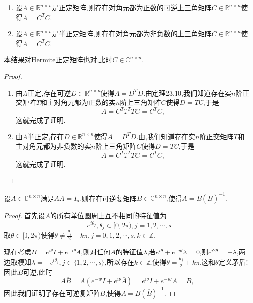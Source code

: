 \documentclass[../../main.tex]{subfiles}
\begin{document}
\begin{theorem}[正定矩阵分解为上三角]\label{theorem:正定矩阵分解为上三角}
\begin{enumerate}
\item 设\( A \in \mathbb{R}^{n \times n} \)是正定矩阵,则存在对角元都为正数的可逆上三角矩阵\( C \in \mathbb{R}^{n \times n} \)使得\( A = C^T C \).

\item 设\( A \in \mathbb{R}^{n \times n} \)是半正定矩阵,则存在对角元都为非负数的上三角矩阵\( C \in \mathbb{R}^{n \times n} \)使得\( A = C^T C \).
\end{enumerate}
\end{theorem}
\begin{note}
本结果对Hermite正定矩阵也对,此时\( C \in \mathbb{C}^{n \times n} \).
\end{note}
\begin{proof}
\begin{enumerate}
\item 由\( A \)正定,存在可逆\( D \in \mathbb{R}^{n \times n} \)使得\( A = D^T D \).由定理23.10,我们知道存在实\( n \)阶正交矩阵\( T \)和主对角元都为正数的实\( n \)阶上三角矩阵\( C \)使得\( D = TC \),于是
\[
A = C^T T^T T C = C^T C,
\]
这就完成了证明.

\item 由\( A \)半正定,存在\( D \in \mathbb{R}^{n \times n} \)使得\( A = D^T D \).由,我们知道存在实\( n \)阶正交矩阵\( T \)和主对角元都为非负数的实\( n \)阶上三角矩阵\( C \)使得\( D = TC \),于是
\[
A = C^T T^T T C = C^T C,
\]
这就完成了证明.
\end{enumerate}
\end{proof}

\begin{theorem}\label{theorem:定理1354846135}
设\( A \in \mathbb{C}^{n \times n} \)满足\( A \overline{A} = I_n \),则存在可逆复矩阵\( B \in \mathbb{C}^{n \times n} \),使得\( A = B (\overline{B})^{-1} \).
\end{theorem}
\begin{proof}
首先设\( A \)的所有单位圆周上互不相同的特征值为
\[
-e^{i\theta_j}, \theta_j \in [0, 2\pi), j = 1, 2, \cdots, s.
\]
取\( \theta \in [0, 2\pi) \)使得\( \theta \neq \frac{\theta_j}{2} + k\pi, j = 0, 1, 2, \cdots, s, k \in \mathbb{Z} \).

现在考虑\( B = e^{i\theta} I + e^{-i\theta} A \),则对任何\( A \)的特征值\( \lambda \),若\( e^{i\theta} + e^{-i\theta} \lambda = 0 \),则\( e^{i2\theta} = -\lambda \),两边取模知\( \lambda = -e^{i\theta_j}, j \in \{1, 2, \cdots, s\} \),所以存在\( k \in \mathbb{Z} \),使得\( \theta = \frac{\theta_j}{2} + k\pi \),这和\( \theta \)定义矛盾!因此\( B \)可逆,此时
\[
A \overline{B} = A \left( e^{-i\theta} I + e^{i\theta} \overline{A} \right) = e^{i\theta} I + e^{-i\theta} A = B,
\]
因此我们证明了存在可逆复矩阵\( B \),使得\( A = B (\overline{B})^{-1} \).
\end{proof}
\end{document}
